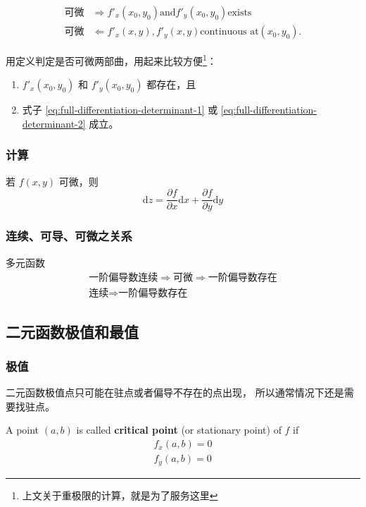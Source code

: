 \begin{align*}
    \mbox{可微} &\Rightarrow f'_x(x_0, y_0) \mbox{and} f'_y(x_0, y_0) \mbox{exists} \\ 
    \mbox{可微} &\Leftarrow  f'_x(x, y), f'_y(x, y) \mbox{continuous at} (x_0, y_0).
\end{align*}

用定义判定是否可微两部曲，用起来比较方便\footnote{上文关于重极限的计算，就是为了服务这里}：
\begin{enumerate}
    \item $f'_x(x_0, y_0)$ 和 $f'_y(x_0, y_0)$ 都存在，且
    \item 式子 \ref{eq:full-differentiation-determinant-1} 或 \ref{eq:full-differentiation-determinant-2} 成立。
\end{enumerate}

\subsubsection{计算}

若 $f(x,y)$ 可微，则
\[
    \mathrm{d}z = \dfrac{\partial f}{\partial x} \mathrm{d}x + \dfrac{\partial f}{\partial y} \mathrm{d}y
\]

\subsubsection{连续、可导、可微之关系}
\label{relationship-among-continuous-differentiable}

多元函数
\begin{gather*}
    \mbox{一阶偏导数连续} \Rightarrow \mbox{可微} \Rightarrow \mbox{一阶偏导数存在} \\
    \mbox{连续} \Rightarrow \mbox{一阶偏导数存在}
\end{gather*}

\subsection{二元函数极值和最值}

\subsubsection{极值}

二元函数极值点只可能在驻点或者偏导不存在的点出现，
所以通常情况下还是需要找驻点。

\begin{definition}
    \label{def:critical_point_multivariable}
    A point $(a, b)$ is called \textbf{critical point} (or stationary point)
    of $f$ if
    \begin{gather*}
        f_x(a, b) = 0\\
        f_y(a, b) = 0
    \end{gather*}
\end{definition}

